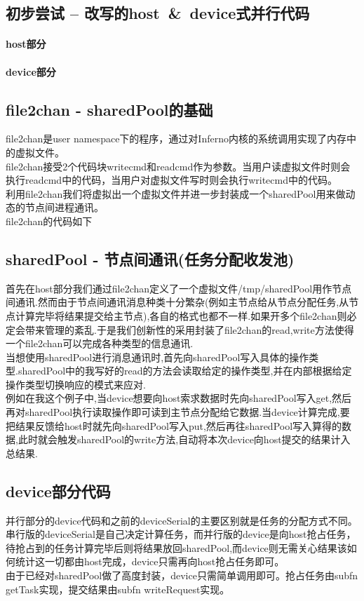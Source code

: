 \documentclass[paper=a4]{ctexart} %
\numberwithin{equation}{section} %
\numberwithin{figure}{section} %
\numberwithin{table}{section} %
\newcommand{\n}{\\\indent}
\begin{document}
\subsection{初步尝试 -- 改写的host~\&~device式并行代码}
\paragraph{host部分}  

\paragraph{device部分}
  

\subsection{file2chan - sharedPool的基础}
file2chan是user namespace下的程序，通过对Inferno内核的系统调用实现了内存中的虚拟文件。\n
file2chan接受2个代码块writecmd和readcmd作为参数。当用户读虚拟文件时则会执行readcmd中的代码，当用户对虚拟文件写时则会执行writecmd中的代码。\n
利用file2chan我们将虚拟出一个虚拟文件并进一步封装成一个sharedPool用来做动态的节点间进程通讯。\n
file2chan的代码如下



\subsection{sharedPool - 节点间通讯(任务分配收发池)}
首先在host部分我们通过file2chan定义了一个虚拟文件/tmp/sharedPool用作节点间通讯.然而由于节点间通讯消息种类十分繁杂(例如主节点给从节点分配任务,从节点计算完毕将结果提交给主节点),各自的格式也都不一样.如果开多个file2chan则必定会带来管理的紊乱.于是我们创新性的采用封装了file2chan的read,write方法使得一个file2chan可以完成各种类型的信息通讯. \n
当想使用sharedPool进行消息通讯时,首先向sharedPool写入具体的操作类型.sharedPool中的我写好的read的方法会读取给定的操作类型,并在内部根据给定操作类型切换响应的模式来应对. \n
例如在我这个例子中,当device想要向host索求数据时先向sharedPool写入get,然后再对sharedPool执行读取操作即可读到主节点分配给它数据.当device计算完成,要把结果反馈给host时就先向sharedPool写入put,然后再往sharedPool写入算得的数据,此时就会触发sharedPool的write方法,自动将本次device向host提交的结果计入总结果.

\subsection{device部分代码}
并行部分的device代码和之前的deviceSerial的主要区别就是任务的分配方式不同。串行版的deviceSerial是自己决定计算任务，而并行版的device是向host抢占任务，待抢占到的任务计算完毕后则将结果放回sharedPool,而device则无需关心结果该如何统计这一切都由host完成，device只需再向host抢占任务即可。\n
由于已经对sharedPool做了高度封装，device只需简单调用即可。抢占任务由subfn getTask实现，提交结果由subfn writeRequest实现。
\end{document}
